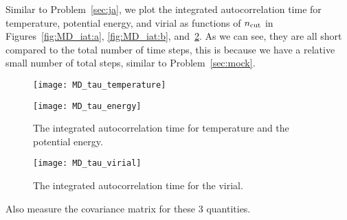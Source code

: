Similar to Problem~\ref{sec:ja}, we plot the integrated autocorrelation time
for temperature, potential energy, and virial as functions of \(n_\textnormal{cut}\)
in Figures~\ref{fig:MD_iat:a},
\ref{fig:MD_iat:b}, and~\ref{fig:MD_iat:c}.
As we can see, they are all short compared to the total number of time steps,
this is because we have a relative small number of total steps, similar to
Problem~\ref{sec:mock}.

\begin{figure}
    \centering
    \begin{minipage}[t]{0.8\linewidth}
        \centering
        \texttt{[image: MD\_tau\_temperature]}
        \label{fig:MD_iat:a}
    \end{minipage}
    \hfill
    \begin{minipage}[t]{0.8\linewidth}
        \centering
        \texttt{[image: MD\_tau\_energy]}
        \label{fig:MD_iat:b}
    \end{minipage}
    \caption{The integrated autocorrelation time for temperature and the potential energy.}
    \label{fig:MD_iat}
\end{figure}

\begin{figure}[H]
    \centering
    \texttt{[image: MD\_tau\_virial]}
    \caption{The integrated autocorrelation time for the virial.}
    \label{fig:MD_iat:c}
\end{figure}


\Question{} Also measure the covariance matrix for these \(3\) quantities.

